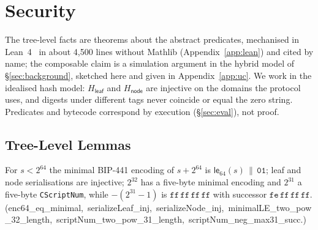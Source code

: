 \documentclass[runningheads]{llncs}
\newif\iffullversion
\newcommand{\lifted}[1]{\iffullversion\S\ref{#1}\else Appendix~\ref{#1}\fi}
\newcommand{\Hleaf}{\ensuremath{H_{\mathsf{leaf}}}}
\newcommand{\Hnode}{\ensuremath{H_{\mathsf{node}}}}
\newcommand{\lesf}{\ensuremath{\mathsf{le}_{64}}}
\newcommand{\lean}[1]{{\small\textsf{#1}}}
\begin{document}
\iffullversion

\fi



\iffullversion
\section{Security}\label{sec:security}

The tree-level facts are theorems about the abstract predicates,
mechanised in Lean~4~\cite{lean4} in about 4{,}500 lines without Mathlib
(Appendix~\ref{app:lean}) and cited by name; the composable claim is a
simulation argument in the hybrid model of \S\ref{sec:background},
sketched here and given in \lifted{app:uc}. We work in the idealised hash
model: $\Hleaf$ and $\Hnode$ are injective on the domains the protocol
uses, and digests under different tags never coincide or equal the zero
string. Predicates and bytecode correspond by execution
(\S\ref{sec:eval}), not proof.

\subsection{Tree-Level Lemmas}

\begin{lemma}[Encodings]\label{lem:enc}
For $s < 2^{64}$ the minimal BIP-441 encoding of $s + 2^{64}$ is
$\lesf(s)\,\|\,\mathtt{01}$; leaf and node serialisations are injective;
$2^{32}$ has a five-byte minimal encoding and $2^{31}$ a five-byte
\texttt{CScriptNum}, while $-(2^{31}-1)$ is $\mathtt{ff\,ff\,ff\,ff}$
with successor $\mathtt{fe\,ff\,ff\,ff}$.
(\lean{enc64\_eq\_minimal},\allowbreak\ \lean{serializeLeaf\_inj},\allowbreak\
\lean{serializeNode\_inj},\allowbreak\ \lean{minimalLE\_two\_pow\_32\_length},\allowbreak\
\lean{scriptNum\_two\_pow\_31\_length},\allowbreak\
\lean{scriptNum\_neg\_max31\_succ}.)
\end{lemma}
\end{document}
